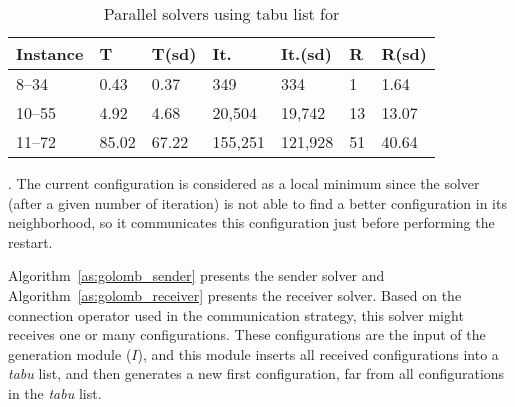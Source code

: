 
\begin{table}[h]
\centering 
\renewcommand{\arraystretch}{1}
\begin{tabular}{p{2cm}|R{1.2cm}R{1.2cm}|R{1.5cm}R{1.5cm}|R{0.8cm}R{1.2cm}}
	\hline 	
	{\bf Instance} & T & T(sd) & It. & It.(sd) & R & R(sd)\\
	\hline
	8--34 & 0.43 & 0.37 & 349 & 334 & 1 & 1.64\\
	10--55 & 4.92 & 4.68 & 20,504 & 19,742 & 13 & 13.07\\
	11--72 & 85.02 & 67.22 & 155,251 & 121,928 & 51 & 40.64\\
	\hline
\end{tabular}
\caption{Parallel solvers using tabu list for \GRP}
\label{tab:golomb_par_tabu}
\end{table}

\separation

. The current configuration is considered as a local minimum since the solver (after a given number of iteration) is not able to find a better configuration in its neighborhood, so it communicates this configuration just before performing the restart. 

Algorithm~\ref{as:golomb_sender} presents the sender solver and Algorithm~\ref{as:golomb_receiver} presents the receiver solver. Based on the connection operator used in the communication strategy, this solver might receives one or many configurations. These configurations are the input of the generation module ($I$), and this module inserts all received configurations into a {\it tabu} list, and then generates a new first configuration, far from all configurations in the {\it tabu} list.

